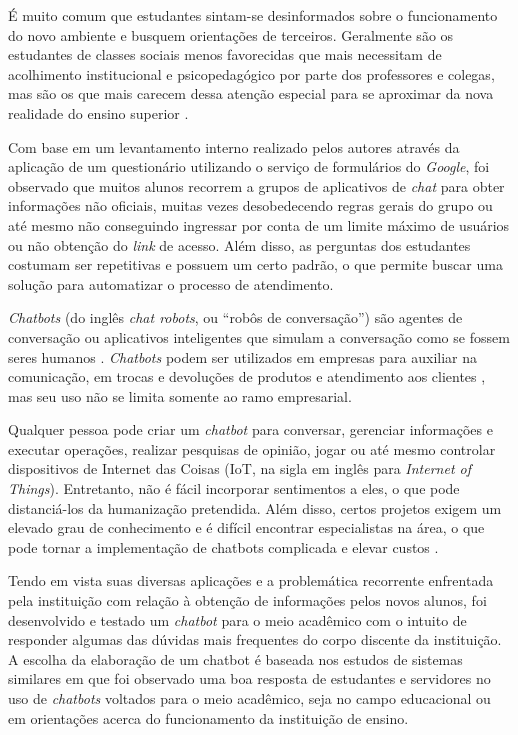 \documentclass[12pt]{article}
\begin{document}
É muito comum que estudantes sintam-se desinformados sobre o funcionamento do novo ambiente e busquem orientações de terceiros. Geralmente são os estudantes de classes sociais menos favorecidas que mais necessitam de acolhimento institucional e psicopedagógico por parte dos professores e colegas, mas são os que mais carecem dessa atenção especial para se aproximar da nova realidade do ensino superior \cite{torres:21}.

Com base em um levantamento interno realizado pelos autores através da aplicação de um questionário utilizando o serviço de formulários do {\itshape Google}, foi observado que muitos alunos recorrem a grupos de aplicativos de {\itshape chat} para obter informações não oficiais, muitas vezes desobedecendo regras gerais do grupo ou até mesmo não conseguindo ingressar por conta de um limite máximo de usuários ou não obtenção do {\itshape link} de acesso. Além disso, as perguntas dos estudantes costumam ser repetitivas e possuem um certo padrão, o que permite buscar uma solução para automatizar o processo de atendimento.

{\itshape Chatbots} (do inglês {\itshape chat robots}, ou “robôs de conversação”) são agentes de conversação ou aplicativos inteligentes que simulam a conversação como se fossem seres humanos \cite{lucchesi:18}. {\itshape Chatbots} podem ser utilizados em empresas para auxiliar na comunicação, em trocas e devoluções de produtos e atendimento aos clientes \cite{correia:19} \cite{valente:20}, mas seu uso não se limita somente ao ramo empresarial.

Qualquer pessoa pode criar um {\itshape chatbot} para conversar, gerenciar informações e executar operações, realizar pesquisas de opinião, jogar ou até mesmo controlar dispositivos de Internet das Coisas (IoT, na sigla em inglês para {\itshape Internet of Things}). Entretanto, não é fácil incorporar sentimentos a eles, o que pode distanciá-los da humanização pretendida. Além disso, certos projetos exigem um elevado grau de conhecimento e é difícil encontrar especialistas na área, o que pode tornar a implementação de chatbots complicada e elevar custos \cite{guerreiro:19}.

Tendo em vista suas diversas aplicações e a problemática recorrente enfrentada pela instituição com relação à obtenção de informações pelos novos alunos, foi desenvolvido e testado um {\itshape chatbot} para o meio acadêmico com o intuito de responder algumas das dúvidas mais frequentes do corpo discente da instituição. A escolha da elaboração de um chatbot é baseada nos estudos de sistemas similares \cite{araujo:20} \cite{bulhoes:20} \cite{lucchesi:18} \cite{maciel:19} \cite{silva:21} em que foi observado uma boa resposta de estudantes e servidores no uso de {\itshape chatbots} voltados para o meio acadêmico, seja no campo educacional ou em orientações acerca do funcionamento da instituição de ensino.
\end{document}
